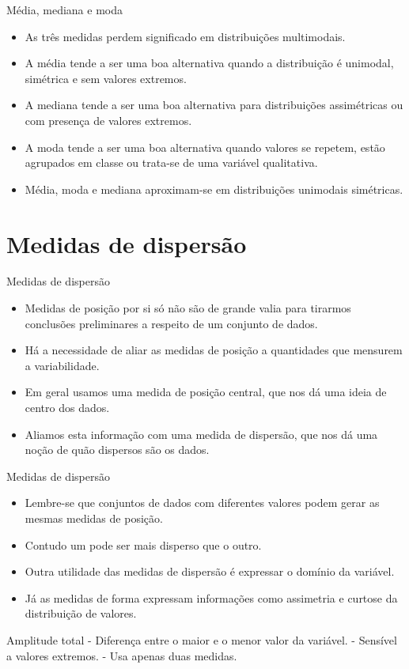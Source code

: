 \documentclass[
  ignorenonframetext,
  serif,
  professionalfont,
  usenames,
  dvipsnames,
  aspectratio = 169]{beamer}
\begin{document}
\begin{frame}{Média, mediana e moda}
\protect\hypertarget{muxe9dia-mediana-e-moda-1}{}
\begin{itemize}
\item
  As três medidas perdem significado em distribuições multimodais.
\item
  A média tende a ser uma boa alternativa quando a distribuição é
  unimodal, simétrica e sem valores extremos.
\item
  A mediana tende a ser uma boa alternativa para distribuições
  assimétricas ou com presença de valores extremos.
\item
  A moda tende a ser uma boa alternativa quando valores se repetem,
  estão agrupados em classe ou trata-se de uma variável qualitativa.
\item
  Média, moda e mediana aproximam-se em distribuições unimodais
  simétricas.
\end{itemize}
\end{frame}

\hypertarget{medidas-de-dispersuxe3o-1}{%
\section{Medidas de dispersão}\label{medidas-de-dispersuxe3o-1}}

\begin{frame}{Medidas de dispersão}
\protect\hypertarget{medidas-de-dispersuxe3o-2}{}
\begin{itemize}
\item
  Medidas de posição por si só não são de grande valia para tirarmos
  conclusões preliminares a respeito de um conjunto de dados.
\item
  Há a necessidade de aliar as medidas de posição a quantidades que
  mensurem a variabilidade.
\item
  Em geral usamos uma medida de posição central, que nos dá uma ideia de
  centro dos dados.
\item
  Aliamos esta informação com uma medida de dispersão, que nos dá uma
  noção de quão dispersos são os dados.
\end{itemize}
\end{frame}

\begin{frame}{Medidas de dispersão}
\protect\hypertarget{medidas-de-dispersuxe3o-3}{}
\begin{itemize}
\item
  Lembre-se que conjuntos de dados com diferentes valores podem gerar as
  mesmas medidas de posição.
\item
  Contudo um pode ser mais disperso que o outro.
\item
  Outra utilidade das medidas de dispersão é expressar o domínio da
  variável.
\item
  Já as medidas de forma expressam informações como assimetria e curtose
  da distribuição de valores.
\end{itemize}

Amplitude total - Diferença entre o maior e o menor valor da variável. -
Sensível a valores extremos. - Usa apenas duas medidas.
\end{frame}
\end{document}
